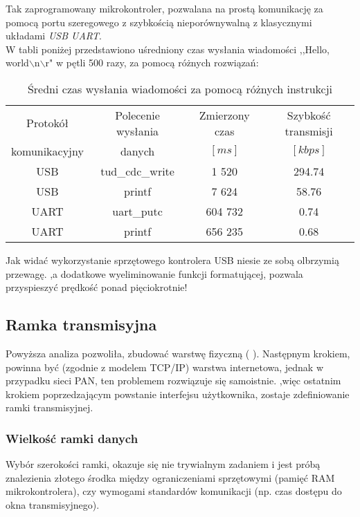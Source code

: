     Tak zaprogramowany mikrokontroler, pozwalana na prostą komunikację za pomocą portu szeregowego z szybkością nieporównywalną z klasycznymi układami \textit{USB UART}.\\
    W tabli poniżej przedstawiono uśredniony czas wysłania wiadomości ,,Hello, world$\backslash$n$\backslash$r" w pętli 500 razy, za pomocą różnych rozwiązań:
    \begin{table}[!ht]
        \centering
        \caption{Średni czas wysłania wiadomości za pomocą różnych instrukcji}
        \begin{tabular}{|c|c|c|c|}\hline
            Protokół      & Polecenie wysłania & Zmierzony czas & Szybkość transmisji\\
            komunikacyjny & danych & $[ms]$& $[kbps]$\\\hline
            USB & tud\_cdc\_write &   1 520 & 294.74  \\\hline
            USB & printf          &   7 624 &  58.76  \\\hline
            UART& uart\_putc      & 604 732 &   0.74 \\\hline
            UART& printf          & 656 235 &   0.68 \\\hline
        \end{tabular}
    \end{table}

    Jak widać wykorzystanie sprzętowego kontrolera USB niesie ze sobą olbrzymią przewagę.
    ,a dodatkowe wyeliminowanie funkcji formatującej, pozwala przyspieszyć prędkość ponad pięciokrotnie!


\subsection{Ramka transmisyjna}
    Powyższa analiza pozwoliła, zbudować warstwę fizyczną ( \cite{Model_TCP_IP}).
    Następnym krokiem, powinna być (zgodnie z modelem TCP/IP) warstwa internetowa, jednak w przypadku sieci PAN, ten problemem rozwiązuje się samoistnie.
    ,więc ostatnim krokiem poprzedzającym powstanie interfejsu użytkownika, zostaje zdefiniowanie ramki transmisyjnej.

    \subsubsection{Wielkość ramki danych}
        Wybór szerokości ramki, okazuje się nie trywialnym zadaniem i jest próbą znalezienia złotego środka między ograniczeniami sprzętowymi (pamięć RAM mikrokontrolera),
        czy wymogami standardów komunikacji (np. czas dostępu do okna transmisyjnego).

